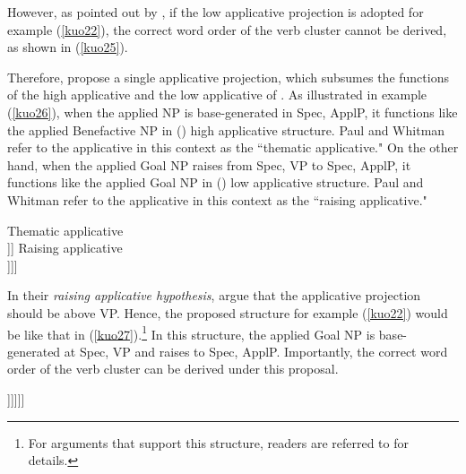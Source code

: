 \documentclass[output=paper,colorlinks,citecolor=brown]{langscibook}
\begin{document}
However, as pointed out by \citet{Paul&Whitman2010}, if the low applicative projection is adopted for example (\ref{kuo22}), the correct word order of the verb cluster cannot be derived, as shown in (\ref{kuo25}).

\z

Therefore, \citet{Paul&Whitman2010} propose a single applicative projection, which subsumes the functions of the high applicative and the low applicative of \citet{Pylkkanen2002, Pylkkanen2008}. As illustrated in example (\ref{kuo26}), when the applied NP is base-generated in Spec, ApplP, it functions like the applied Benefactive NP in  (\citeyear{Pylkkanen2002, Pylkkanen2008}) high applicative structure. Paul and Whitman refer to the applicative in this context as the “thematic applicative." On the other hand, when the applied Goal NP raises from Spec, VP to Spec, ApplP, it functions like the applied Goal NP in  (\citeyear{Pylkkanen2002, Pylkkanen2008}) low applicative structure. Paul and Whitman refer to the applicative in this context as the “raising applicative."

\ea
\label{kuo26}
    \ea
        \glt Thematic applicative\\
        \glt [\textsubscript{APPLP} DP\textsubscript{Benefactive} [\textsubscript{APPL'} Appl [\textsubscript{VP} V DP]]]
    \ex
        \glt Raising applicative\\
        \glt [\textsubscript{APPLP} DP\textsubscript{Goal} [\textsubscript{APPL'} Appl [\textsubscript{VP} t\textsubscript{Goal} [\textsubscript{V'} V DP\textsubscript{Theme} ]]]]
    \z
\z

In their \textit{raising applicative hypothesis}, \citet{Paul&Whitman2010} argue that the applicative projection should be above VP. Hence, the proposed structure for example (\ref{kuo22}) would be like that in (\ref{kuo27}).\footnote{For arguments that support this structure, readers are referred to \citet{Paul&Whitman2010} for details.} In this structure, the applied Goal NP is base-generated at Spec, VP and raises to Spec, ApplP. Importantly, the correct word order of the verb cluster can be derived under this proposal.

\ea
\label{kuo27}
\glt [\textsubscript{TP} Zhangsan [\textsubscript{AspP} xie-gei-le  [\textsubscript{ApplP}  Lisi [\textsubscript{Appl'} t\textsubscript{xie-gei} [\textsubscript{VP} t\textsubscript{Lisi}  [\textsubscript{V'} t\textsubscript{xie}  yi-feng          xin.]]]]]]\\  
\z
\end{document}
